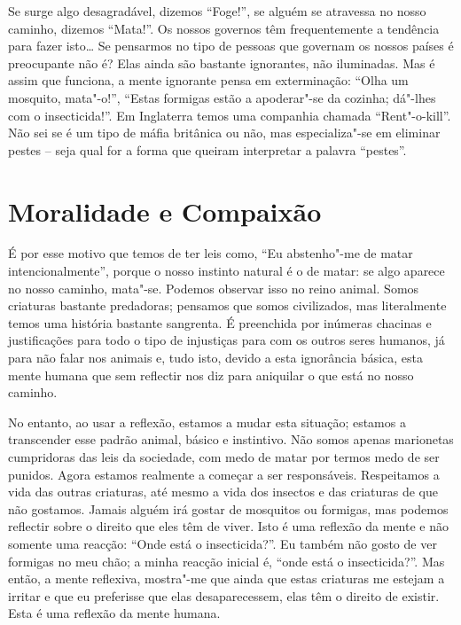 Se surge algo desagradável, dizemos “Foge!”, se alguém se atravessa no nosso
caminho, dizemos “Mata!”. Os nossos governos têm frequentemente a tendência para fazer
isto\ldots{} Se pensarmos no tipo de pessoas que governam os nossos países é
preocupante não é? Elas ainda são bastante ignorantes, não iluminadas. Mas é
assim que funciona, a mente ignorante pensa em exterminação: “Olha um mosquito,
mata"-o!”, “Estas formigas estão a apoderar"-se da cozinha; dá"-lhes com o
insecticida!”. Em Inglaterra temos uma companhia chamada “Rent"-o-kill”. Não sei
se é um tipo de máfia britânica ou não, mas especializa"-se em eliminar pestes –
seja qual for a forma que queiram interpretar a palavra “pestes”.

\clearpage

\section{Moralidade e Compaixão}

É por esse motivo que temos de ter leis como, “Eu abstenho"-me de matar
intencionalmente”, porque o nosso instinto natural é o de matar: se algo aparece no
nosso caminho, mata"-se. Podemos observar isso no reino animal. Somos criaturas
bastante predadoras; pensamos que somos civilizados, mas literalmente temos uma
história bastante sangrenta. É preenchida por inúmeras chacinas e justificações
para todo o tipo de injustiças para com os outros seres humanos, já para não
falar nos animais e, tudo isto, devido a esta ignorância básica, esta mente
humana que sem reflectir nos diz para aniquilar o que está no nosso caminho.

No entanto, ao usar a reflexão, estamos a mudar esta situação; estamos a
transcender esse padrão animal, básico e instintivo. Não somos apenas marionetas
cumpridoras das leis da sociedade, com medo de matar por termos medo de ser
punidos. Agora estamos realmente a começar a ser responsáveis. Respeitamos a
vida das outras criaturas, até mesmo a vida dos insectos e das criaturas de que
não gostamos. Jamais alguém irá gostar de mosquitos ou formigas, mas podemos
reflectir sobre o direito que eles têm de viver. Isto é uma reflexão da mente e
não somente uma reacção: “Onde está o insecticida?”. Eu também não gosto de ver
formigas no meu chão; a minha reacção inicial é, “onde está o insecticida?”. Mas
então, a mente reflexiva, mostra"-me que ainda que estas criaturas me estejam a
irritar e que eu preferisse que elas desaparecessem, elas têm o direito de existir.
Esta é uma reflexão da mente humana.

